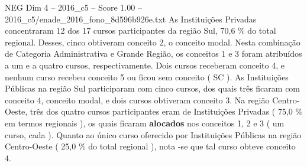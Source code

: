 \begin{textsample}{NEG Dim 4 – 2016\_c5 – Score 1.00 – 2016\_c5/enade\_2016\_fono\_8d596b926e.txt}
As Instituições Privadas concentraram 12 dos 17 cursos participantes da região Sul, 70,6 \% do total regional.
Desses, cinco obtiveram conceito 2, o conceito modal.
Nesta combinação de Categoria Administrativa e Grande Região, os conceitos 1 e 3 foram atribuídos a um e a quatro cursos, respectivamente.
Dois cursos receberam conceito 4, e nenhum curso recebeu conceito 5 ou ficou sem conceito ( SC ).
As Instituições Públicas na região Sul participaram com cinco cursos, dos quais três ficaram com conceito 4, conceito modal, e dois cursos obtiveram conceito 3.
Na região Centro-Oeste, três dos quatro cursos participantes eram de Instituições Privadas ( 75,0 \% em termos regionais ), os quais ficaram \textbf{alocados} nos conceitos 1, 2 e 3 ( um curso, cada ).
Quanto ao único curso oferecido por Instituições Públicas na região Centro-Oeste ( 25,0 \% do total regional ), nota -se que tal curso obteve conceito 4.

\end{textsample}
